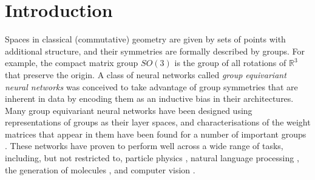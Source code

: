 \documentclass{article}
\theoremstyle{plain}
\theoremstyle{definition}
\theoremstyle{remark}
\begin{document}
\begin{abstract}
	Group equivariant neural networks have proven effective in modelling a wide
	range of tasks where the data lives in a classical geometric space and exhibits
	well-defined group symmetries.
	However, these networks are not suitable for learning from data 
	that lives in a non-commutative geometry,
	described formally by non-commutative $C^{*}$-algebras,
	since the $C^{*}$-algebra of 
	continuous functions on a compact matrix group is commutative.
	To address this limitation, we derive the existence of
	a new type 
	of equivariant neural network, 
	called compact matrix quantum group equivariant neural networks, 
	which encode 
	symmetries that are described by
	compact matrix quantum groups.
	We characterise the weight matrices that appear in these neural networks 
	for the easy compact matrix quantum groups, 
	which are defined by set partitions.
	As a result, we obtain new characterisations of equivariant weight matrices 
	for some compact matrix groups that have not appeared previously
	in the machine learning literature.
\end{abstract}

\section{Introduction} \label{qcintroduction}

Spaces in classical (commutative) geometry are given by 
sets of points with additional structure,
and their symmetries are formally described by groups.
For example, the compact matrix group $SO(3)$ is the group of all rotations 
of $\mathbb{R}^{3}$ that preserve the origin.
A class of neural networks called \textit{group equivariant neural networks}
was conceived to take advantage of group symmetries that are inherent in data 
by encoding them as an inductive bias in their architectures.
Many group equivariant neural networks have been designed using 
representations of groups as their layer spaces,
and characterisations of the weight matrices that appear in them 
have been found for a number of important groups 
\citep{deepsets, ravanbakhsh17a, maron2018, finzi, villar2021scalars, pearcecrumpB, pearcecrumpJ, pearcecrump, godfrey}.
These networks have proven to perform well across a wide range of tasks, including, but not restricted to, particle physics \citep{bogatskiy2020}, natural language processing \citep{gordon2020}, the generation of molecules \citep{satorras21a}, and computer vision \citep{chatzipantazis2023}.
\end{document}
